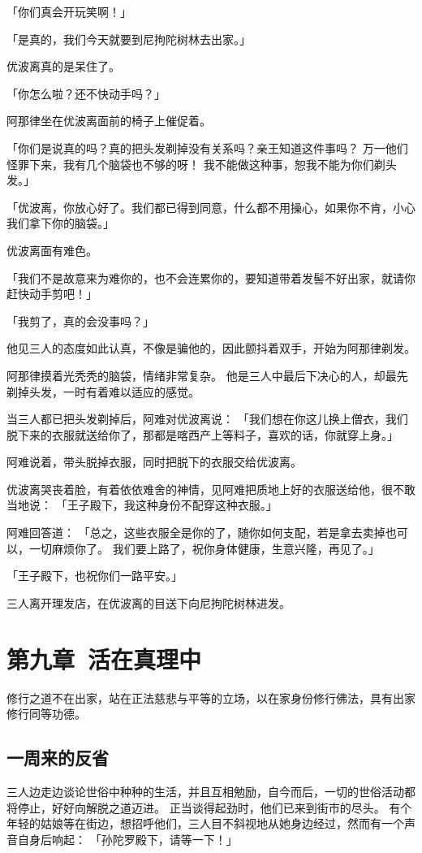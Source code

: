 \documentclass[twoside,openany]{book}
\begin{document}
「你们真会开玩笑啊！」

「是真的，我们今天就要到尼拘陀树林去出家。」

优波离真的是呆住了。

「你怎么啦？还不快动手吗？」

阿那律坐在优波离面前的椅子上催促着。

「你们是说真的吗？真的把头发剃掉没有关系吗？亲王知道这件事吗？
万一他们怪罪下来，我有几个脑袋也不够的呀！
我不能做这种事，恕我不能为你们剃头发。」

「优波离，你放心好了。我们都已得到同意，什么都不用操心，如果你不肯，小心我们拿下你的脑袋。」

优波离面有难色。

「我们不是故意来为难你的，也不会连累你的，要知道带着发髻不好出家，就请你赶快动手剪吧！」

「我剪了，真的会没事吗？」

他见三人的态度如此认真，不像是骗他的，因此颤抖着双手，开始为阿那律剃发。

阿那律摸着光秃秃的脑袋，情绪非常复杂。
他是三人中最后下决心的人，却最先剃掉头发，一时有着难以适应的感觉。

当三人都已把头发剃掉后，阿难对优波离说：
「我们想在你这儿换上僧衣，我们脱下来的衣服就送给你了，那都是喀西产上等料子，喜欢的话，你就穿上身。」

阿难说着，带头脱掉衣服，同时把脱下的衣服交给优波离。

优波离哭丧着脸，有着依依难舍的神情，见阿难把质地上好的衣服送给他，很不敢当地说：
「王子殿下，我这种身份不配穿这种衣服。」

阿难回答道：
「总之，这些衣服全是你的了，随你如何支配，若是拿去卖掉也可以，一切麻烦你了。
我们要上路了，祝你身体健康，生意兴隆，再见了。」

「王子殿下，也祝你们一路平安。」

三人离开理发店，在优波离的目送下向尼拘陀树林进发。



\chapter{第九章\ 活在真理中}\label{ch9}
修行之道不在出家，站在正法慈悲与平等的立场，以在家身份修行佛法，具有出家修行同等功德。

\section{一周来的反省}\label{sec9.1}
三人边走边谈论世俗中种种的生活，并且互相勉励，自今而后，一切的世俗活动都将停止，好好向解脱之道迈进。
正当谈得起劲时，他们已来到街市的尽头。
有个年轻的姑娘等在街边，想招呼他们，三人目不斜视地从她身边经过，然而有一个声音自身后响起：
「孙陀罗殿下，请等一下！」
\end{document}
